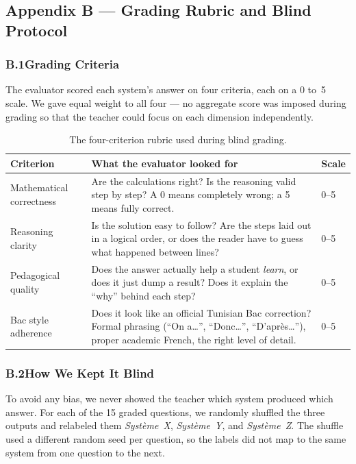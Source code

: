 \subsection*{Appendix B — Grading Rubric and Blind Protocol}
\label{app:rubric}

\subsubsection*{B.1\quad Grading Criteria}

The evaluator scored each system's answer on four criteria, each on a 0
to~5 scale. We gave equal weight to all four — no aggregate score was
imposed during grading so that the teacher could focus on each dimension
independently.

\begin{table}[H]
\centering
\caption{The four-criterion rubric used during blind grading.}
\label{tab:app-rubric}
\small
\begin{tabularx}{\textwidth}{l X l}
\toprule
\textbf{Criterion} & \textbf{What the evaluator looked for} & \textbf{Scale} \\
\midrule
Mathematical correctness &
Are the calculations right? Is the reasoning valid step by step?
A 0 means completely wrong; a 5 means fully correct.
& 0--5 \\
\addlinespace
Reasoning clarity &
Is the solution easy to follow? Are the steps laid out in a logical
order, or does the reader have to guess what happened between lines?
& 0--5 \\
\addlinespace
Pedagogical quality &
Does the answer actually help a student \textit{learn}, or does it
just dump a result? Does it explain the ``why'' behind each step?
& 0--5 \\
\addlinespace
Bac style adherence &
Does it look like an official Tunisian Bac correction? Formal
phrasing (``On a\ldots'', ``Donc\ldots'', ``D'après\ldots''),
proper academic French, the right level of detail.
& 0--5 \\
\bottomrule
\end{tabularx}
\end{table}

\subsubsection*{B.2\quad How We Kept It Blind}

To avoid any bias, we never showed the teacher which system produced which
answer. For each of the 15 graded questions, we randomly shuffled the three
outputs and relabeled them \textit{Système~X}, \textit{Système~Y}, and
\textit{Système~Z}. The shuffle used a different random seed per question,
so the labels did not map to the same system from one question to the next.

